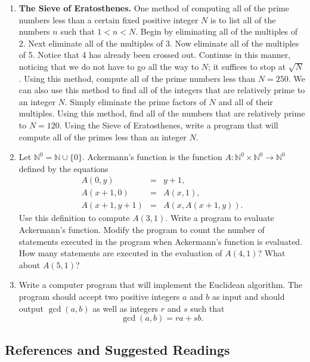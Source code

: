 {\small
\begin{enumerate}
 
\item
{\bf The Sieve of Eratosthenes.}  
One method of computing all of the prime numbers less than a certain fixed positive integer $N$ is to list all of the numbers $n$ such that $1 < n < N$.  Begin by eliminating all of the multiples of 2.  Next eliminate all of the multiples of 3. Now eliminate all of the  multiples of 5.  Notice that 4 has already been crossed out.  Continue in this manner, noticing that we do not have to go all the way to $N$; it suffices to stop at $\sqrt{N}$.  Using this method, compute all of the prime numbers less than $N = 250$.  We can also use this method to find all of the integers that are relatively prime to an integer $N$.  Simply eliminate the prime factors of $N$ and all of their multiples.  Using this method, find all of the numbers that are relatively prime to $N= 120$.  Using the Sieve of Eratosthenes, write a program that will compute all of the primes less than an integer $N$. 

\item
Let ${\mathbb N}^0 = {\mathbb N} \cup \{ 0 \}$. Ackermann's function is the function $A :{\mathbb N}^0 \times {\mathbb N}^0 \rightarrow {\mathbb N}^0$ defined by the equations 
\begin{eqnarray*}
A(0, y) & = & y + 1, \\
A(x + 1, 0) & = & A(x, 1), \\
A(x + 1, y + 1) & = & A(x, A(x + 1, y)).
\end{eqnarray*}
Use this definition to compute $A(3, 1)$.  Write a program to evaluate Ackermann's function.  Modify the  program to count the number of statements executed in the program when Ackermann's function is evaluated.  How many statements are executed in the evaluation of $A(4, 1)$?  What about $A(5, 1)$?

\item
Write a computer program that will implement the Euclidean algorithm.  The program should accept two positive integers $a$ and $b$ as input and should output $\gcd( a,b)$ as well as integers $r$ and $s$ such that 
$$
\gcd( a,b) = ra + sb.
$$
 
\end{enumerate}
}
 
 
\subsection*{References and Suggested Readings} %

